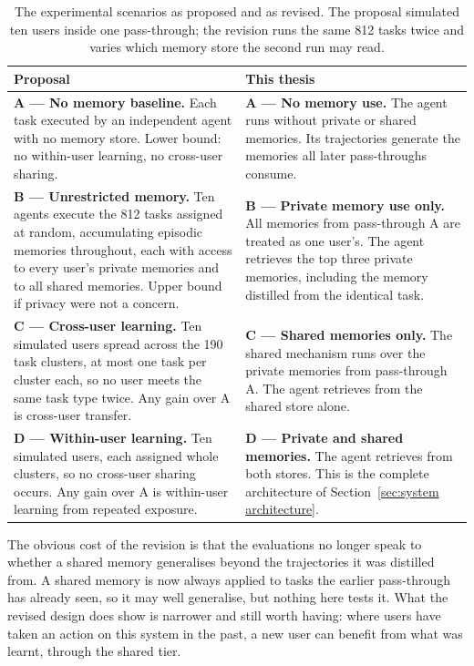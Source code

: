 \begin{table}[t]
\centering
\small
\begin{tabularx}{\textwidth}{@{}XX@{}}
\toprule
\textbf{Proposal} & \textbf{This thesis} \\
\midrule
\textbf{A — No memory baseline.} Each task executed by an independent agent with no memory store. Lower bound: no within-user learning, no cross-user sharing. &
\textbf{A — No memory use.} The agent runs without private or shared memories. Its trajectories generate the memories all later pass-throughs consume. \\
\addlinespace
\textbf{B — Unrestricted memory.} Ten agents execute the 812 tasks assigned at random, accumulating episodic memories throughout, each with access to every user's private memories and to all shared memories. Upper bound if privacy were not a concern. &
\textbf{B — Private memory use only.} All memories from pass-through A are treated as one user's. The agent retrieves the top three private memories, including the memory distilled from the identical task. \\
\addlinespace
\textbf{C — Cross-user learning.} Ten simulated users spread across the 190 task clusters, at most one task per cluster each, so no user meets the same task type twice. Any gain over A is cross-user transfer. &
\textbf{C — Shared memories only.} The shared mechanism runs over the private memories from pass-through A. The agent retrieves from the shared store alone. \\
\addlinespace
\textbf{D — Within-user learning.} Ten simulated users, each assigned whole clusters, so no cross-user sharing occurs. Any gain over A is within-user learning from repeated exposure. &
\textbf{D — Private and shared memories.} The agent retrieves from both stores. This is the complete architecture of Section~\ref{sec:system architecture}. \\
\bottomrule
\end{tabularx}
\caption{The experimental scenarios as proposed and as revised. The proposal simulated ten users inside one pass-through; the revision runs the same 812 tasks twice and varies which memory store the second run may read.}
\label{tab:scenario-revision}
\end{table}

The obvious cost of the revision is that the evaluations no longer speak to whether a shared memory generalises beyond the trajectories it was distilled from. A shared memory is now always applied to tasks the earlier pass-through has already seen, so it may well generalise, but nothing here tests it. What the revised design does show is narrower and still worth having: where users have taken an action on this system in the past, a new user can benefit from what was learnt, through the shared tier.

